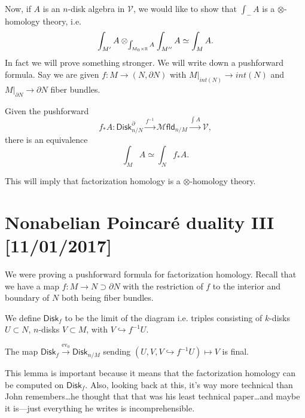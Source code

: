 \documentclass{amsart}
\DeclareMathOperator{\ev}{ev}
\newcommand{\diskm}{\mathsf{Disk}_{n/M}}
\newcommand{\mfldm}{\mathscr{M}\mathsf{fld}_{n/M}}
\begin{document}
Now, if $A$ is an $n$-disk algebra in $\mathcal{V}$, we would like to show that $\int_- A$
is a $\otimes$-homology theory, i.e.
\begin{equation*}
    \int_{M'}A\otimes_{\int_{M_0\times \mathbb{R}}A}\int_{M''}A \simeq \int_M A.
\end{equation*}
In fact we will prove something stronger. We will write down a pushforward formula.
Say we are given $f:M\to (N,\partial N)$ with $M|_{int(N)}\to int(N)$ and $M|_{\partial N}\to \partial N$
fiber bundles.
\begin{theorem}
    Given the pushforward
    \begin{equation*}
        f_*A:\mathsf{Disk}_{n/N}^\partial \xrightarrow{f^{-1}}\mfldm\xrightarrow{\int A}\mathcal{V},
    \end{equation*}
    there is an equivalence
    \begin{equation*}
        \int_M A\simeq \int_N f_*A.
    \end{equation*}
\end{theorem}
This will imply that factorization homology is a $\otimes$-homology theory.

\newpage

\section{Nonabelian Poincar\'e duality III [11/01/2017]}

We were proving a pushforward formula for factorization homology. Recall that we have
a map $f:M\to N\supset \partial N$ with the restriction of $f$ to the interior and boundary of $N$
both being fiber bundles.
\begin{definition}
    We define $\mathsf{Disk}_f$ to be the limit of the diagram
    i.e. triples consisting of $k$-disks $U\subset N$, $n$-disks $V\subset M$, with $V\hookrightarrow f^{-1}U$.
\end{definition}
\begin{lemma}
    The map $\mathsf{Disk}_f\xrightarrow{\ev_0}\diskm$ sending $(U,V,V\hookrightarrow f^{-1}U)\mapsto V$
    is final.
\end{lemma}
This lemma is important because it means that the factorization homology can be computed on $\mathsf{Disk}_f$.
Also, looking back at this, it's way more technical than John remembers\ldots he thought that that was his
least technical paper\ldots and maybe it is---just everything he writes is incomprehensible.
\end{document}
